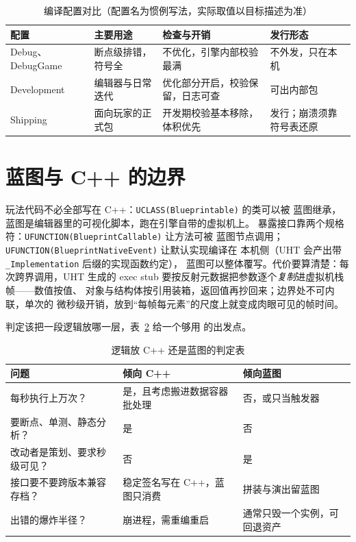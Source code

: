 \documentclass[12pt,a4paper,fontset=fandol]{ctexbook}
\newcommand{\Tp}[1]{\texttt{#1}}
\newcommand{\Bk}{\discretionary{}{}{}}
\newcommand{\Lang}[1]{\textsf{#1}}
\newcommand{\CPP}{\Lang{C++}}
\begin{document}
\begin{table}[ht]
\centering
\caption{编译配置对比（配置名为惯例写法，实际取值以目标描述为准）}
\label{tab:ch10-configs}
\begin{tabular}{>{\raggedright\arraybackslash}p{}
                >{\raggedright\arraybackslash}p{}
                >{\raggedright\arraybackslash}p{}
                >{\raggedright\arraybackslash}p{}}
\toprule
\textbf{配置} & \textbf{主要用途} & \textbf{检查与开销} & \textbf{发行形态} \\
\midrule
Debug、DebugGame & 断点级排错，符号全 & 不优化，引擎内部校验最满 & 不外发，只在本机 \\
Development & 编辑器与日常迭代 & 优化部分开启，校验保留，日志可查 & 可出内部包 \\
Shipping & 面向玩家的正式包 & 开发期校验基本移除，体积优先 & 发行；崩溃须靠符号表还原 \\
\bottomrule
\end{tabular}
\end{table}

\section{蓝图与 \CPP{} 的边界}
\label{sec:ch10-blueprint-cpp}

玩法代码不必全部写在 \CPP{}：\Tp{UCLASS(Blueprintable)} 的类可以被
蓝图继承，蓝图是编辑器里的可视化脚本，跑在引擎自带的虚拟机上。
暴露接口靠两个规格符：\Tp{UFUNCTION(Blueprint{\Bk}Callable)} 让方法可被
蓝图节点调用；\Tp{UFUNCTION(Blueprint{\Bk}Native{\Bk}Event)} 让默认实现编译在
本机侧（UHT 会产出带 \Tp{\_{\Bk}Implementation} 后缀的实现函数约定），
蓝图可以整体覆写。代价要算清楚：每次跨界调用，UHT 生成的 exec
stub 要按反射元数据把参数逐个\emph{复制}进虚拟机栈帧——数值按值、
对象与结构体按引用装箱，返回值再抄回来；边界处不可内联，单次的
微秒级开销，放到``每帧每元素''的尺度上就变成肉眼可见的帧时间。

判定该把一段逻辑放哪一层，表~\ref{tab:ch10-placement} 给一个够用
的出发点。

\begin{table}[ht]
\centering
\caption{逻辑放 \CPP{} 还是蓝图的判定表}
\label{tab:ch10-placement}
\begin{tabular}{>{\raggedright\arraybackslash}p{}
                >{\raggedright\arraybackslash}p{}
                >{\raggedright\arraybackslash}p{}}
\toprule
\textbf{问题} & \textbf{倾向 \CPP{}} & \textbf{倾向蓝图} \\
\midrule
每秒执行上万次？ & 是，且考虑搬进数据容器批处理 & 否，或只当触发器 \\
要断点、单测、静态分析？ & 是 & 否 \\
改动者是策划、要求秒级可见？ & 否 & 是 \\
接口要不要跨版本兼容存档？ & 稳定签名写在 \CPP{}，蓝图只消费 & 拼装与演出留蓝图 \\
出错的爆炸半径？ & 崩进程，需重编重启 & 通常只毁一个实例，可回退资产 \\
\bottomrule
\end{tabular}
\end{table}
\end{document}
